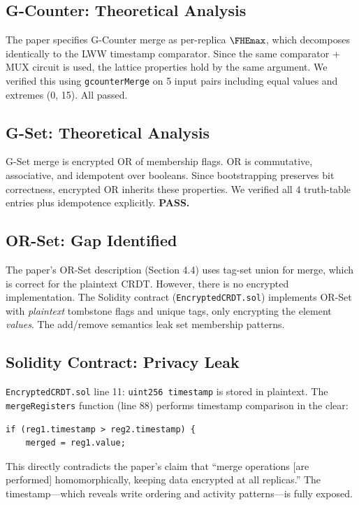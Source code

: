 \documentclass{fhe-shared/luxfhe}
\begin{document}
\subsection{G-Counter: Theoretical Analysis}

The paper specifies G-Counter merge as per-replica $\FHEmax$, which
decomposes identically to the LWW timestamp comparator.  Since the
same comparator + MUX circuit is used, the lattice properties hold by
the same argument.  We verified this using \texttt{gcounterMerge} on
5 input pairs including equal values and extremes (0, 15).  All passed.

\subsection{G-Set: Theoretical Analysis}

G-Set merge is encrypted OR of membership flags.  OR is commutative,
associative, and idempotent over booleans.  Since bootstrapping
preserves bit correctness, encrypted OR inherits these properties.
We verified all 4 truth-table entries plus idempotence explicitly.
\textbf{PASS.}

\subsection{OR-Set: Gap Identified}

The paper's OR-Set description (Section 4.4) uses tag-set union for
merge, which is correct for the plaintext CRDT.  However, there is no
encrypted implementation.  The Solidity contract (\texttt{EncryptedCRDT.sol})
implements OR-Set with \emph{plaintext} tombstone flags and unique tags,
only encrypting the element \emph{values}.  The add/remove semantics leak
set membership patterns.

\subsection{Solidity Contract: Privacy Leak}

\texttt{EncryptedCRDT.sol} line 11: \texttt{uint256 timestamp} is
stored in plaintext.  The \texttt{mergeRegisters} function (line 88)
performs timestamp comparison in the clear:
\begin{lstlisting}[language=Solidity]
if (reg1.timestamp > reg2.timestamp) {
    merged = reg1.value;
\end{lstlisting}
This directly contradicts the paper's claim that ``merge operations
[are performed] homomorphically, keeping data encrypted at all
replicas.''  The timestamp---which reveals write ordering and
activity patterns---is fully exposed.
\end{document}
